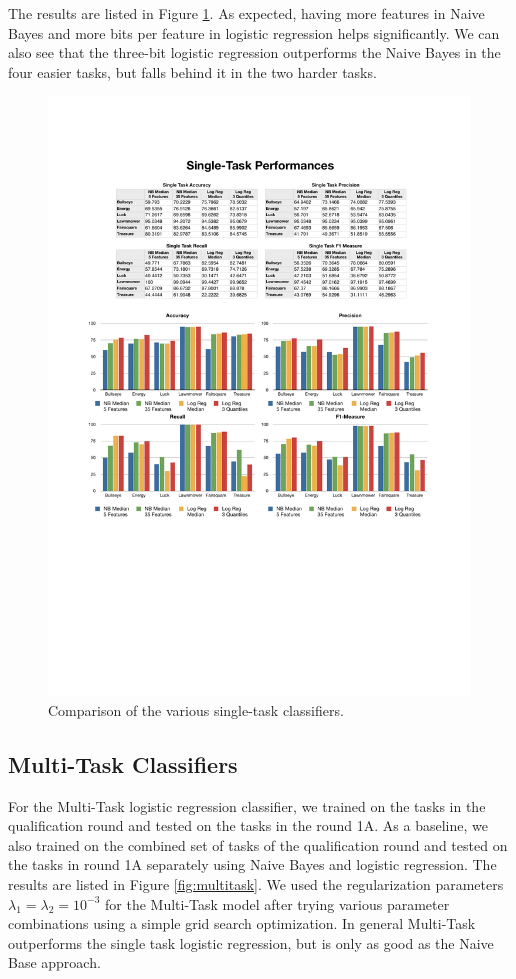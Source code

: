 The results are listed in Figure \ref{fig:singletask}. As expected, having more features in Naive Bayes and more bits per feature in logistic regression helps significantly. We can also see that the three-bit logistic regression outperforms the Naive Bayes in the four easier tasks, but falls behind it in the two harder tasks.

%
\begin{figure}
    \centering
    \setlength{\tabcolsep}{0.0130\linewidth}
    \includegraphics[width=\linewidth]{figures/SingleTask}
    \caption{Comparison of the various single-task classifiers.%
      \label{fig:singletask}}
\end{figure}


\subsection{Multi-Task Classifiers}
For the Multi-Task logistic regression classifier, we trained on the tasks in the qualification round and tested on the tasks in the round 1A. As a baseline, we also trained on the combined set of tasks of the qualification round and tested on the tasks in round 1A separately using Naive Bayes and logistic regression. The results are listed in Figure \ref{fig:multitask}. We used the regularization parameters $\lambda_1 = \lambda_2 = 10^{-3}$ for the Multi-Task model after trying various parameter combinations using a simple grid search optimization. In general Multi-Task outperforms the single task logistic regression, but is only as good as the Naive Base approach.


